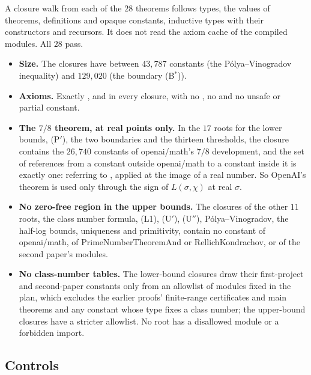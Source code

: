 \documentclass[11pt]{article}
\theoremstyle{definition}
\begin{document}
A closure walk from each of the $28$ theorems follows types, the values of theorems, definitions and opaque constants, inductive types with their constructors and recursors. It does not read the axiom cache of the compiled modules. All $28$ pass.
\begin{itemize}[nosep]
\item \textbf{Size.} The closures have between $43{,}787$ constants (the Pólya--Vinogradov inequality) and $129{,}020$ (the boundary (B$^*$)).
\item \textbf{Axioms.} Exactly ,  and  in every closure, with no , no  and no unsafe or partial constant.
\item \textbf{The $7/8$ theorem, at real points only.} In the $17$ roots for the lower bounds, (P$'$), the two boundaries and the thirteen thresholds, the closure contains the $26{,}740$ constants of openai/math's $7/8$ development, and the set of references from a constant outside openai/math to a constant inside it is exactly one:  referring to , applied at the image of a real number. So OpenAI's theorem is used only through the sign of $L(\sigma,\chi)$ at real $\sigma$.
\item \textbf{No zero-free region in the upper bounds.} The closures of the other $11$ roots, the class number formula, (L1), (U$'$), (U$''$), Pólya--Vinogradov, the half-log bounds, uniqueness and primitivity, contain no constant of openai/math, of PrimeNumberTheoremAnd or RellichKondrachov, or of the second paper's  modules.
\item \textbf{No class-number tables.} The lower-bound closures draw their first-project and second-paper constants only from an allowlist of modules fixed in the plan, which excludes the earlier proofs' finite-range certificates and main theorems and any constant whose type fixes a class number; the upper-bound closures have a stricter allowlist. No root has a disallowed module or a forbidden import.
\end{itemize}

\subsection{Controls}\label{sec:controls}
\end{document}
